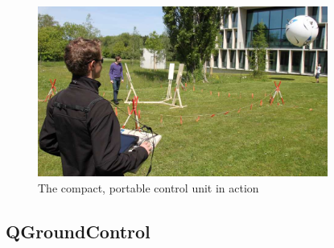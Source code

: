 \begin{figure}[H]
	\begin{center}
		\includegraphics[width=0.85\textwidth]{graphics/HMI_in_Action}
		\caption{The compact, portable control unit in action}  
		\label{fig:HMI_in_Action}
	\end{center}
\end{figure}



\subsection{QGroundControl}
\label{subsec:qGroundControl}

